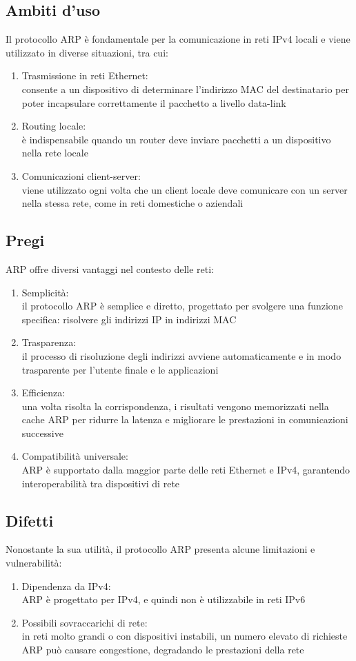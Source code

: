 \documentclass[10pt,oneside,a4paper]{article}
\begin{document}
\subsection{Ambiti d'uso}
Il protocollo ARP è fondamentale per la comunicazione in reti IPv4 locali e viene utilizzato in diverse situazioni, tra cui:
\begin{enumerate}
\item Trasmissione in reti Ethernet:\\
consente a un dispositivo di determinare l'indirizzo MAC del destinatario per poter incapsulare correttamente il pacchetto a livello data-link
\item Routing locale:\\
è indispensabile quando un router deve inviare pacchetti a un dispositivo nella rete locale
\item Comunicazioni client-server:\\
viene utilizzato ogni volta che un client locale deve comunicare con un server nella stessa rete, come in reti domestiche o aziendali
\end{enumerate}
\subsection{Pregi}
ARP offre diversi vantaggi nel contesto delle reti:
\begin{enumerate}
\item Semplicità:\\
il protocollo ARP è semplice e diretto, progettato per svolgere una funzione specifica: risolvere gli indirizzi IP in indirizzi MAC
\item Trasparenza:\\
il processo di risoluzione degli indirizzi avviene automaticamente e in modo trasparente per l'utente finale e le applicazioni
\item Efficienza:\\
una volta risolta la corrispondenza, i risultati vengono memorizzati nella cache ARP per ridurre la latenza e migliorare le prestazioni in comunicazioni successive
\item Compatibilità universale:\\
ARP è supportato dalla maggior parte delle reti Ethernet e IPv4, garantendo interoperabilità tra dispositivi di rete
\end{enumerate}
\subsection{Difetti}
Nonostante la sua utilità, il protocollo ARP presenta alcune limitazioni e vulnerabilità:
\begin{enumerate}
\item Dipendenza da IPv4:\\
ARP è progettato per IPv4, e quindi non è utilizzabile in reti IPv6
\item Possibili sovraccarichi di rete:\\
in reti molto grandi o con dispositivi instabili, un numero elevato di richieste ARP può causare congestione, degradando le prestazioni della rete
\end{enumerate}
\end{document}

